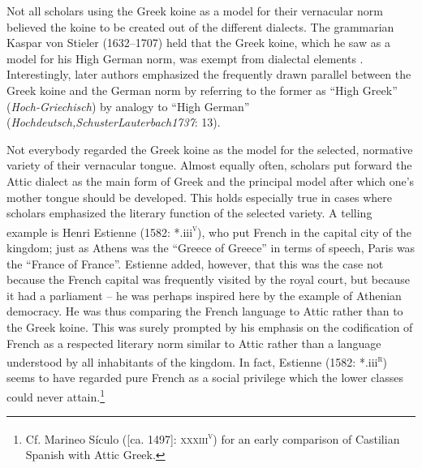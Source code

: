 Not all scholars using the Greek koine as a model for their vernacular norm believed the koine to be created out of the different dialects. The grammarian Kaspar von Stieler (1632–1707) held that the Greek koine, which he saw as a model for his High German norm, was exempt from dialectal elements \citep[2]{Stieler1691}. Interestingly, later authors emphasized the frequently drawn parallel between the Greek koine and the German norm by referring to the former as “High Greek” (\textit{Hoch-Griechisch}) by analogy to “High German” (\textit{Hochdeutsch,SchusterLauterbach1737}: 13).

Not everybody regarded the Greek koine as the model for the selected, normative variety of their vernacular tongue. Almost equally often, scholars put forward the Attic dialect as the main form of Greek and the principal model after which one’s mother tongue should be developed. This holds especially true in cases where scholars emphasized the literary function of the selected variety. A telling example is Henri Estienne (1582: *.iii\textsc{\textsuperscript{v}}), who put French in the capital city of the kingdom; just as Athens was the “Greece of Greece” in terms of speech, Paris was the “France of France”. Estienne added, however, that this was the case not because the French capital was frequently visited by the royal court, but because it had a parliament – he was perhaps inspired here by the example of Athenian democracy. He was thus comparing the French language to Attic rather than to the Greek koine. This was surely prompted by his emphasis on the codification of French as a respected literary norm similar to Attic rather than a language understood by all inhabitants of the kingdom. In fact, Estienne (1582: *.iii\textsc{\textsuperscript{r}}) seems to have regarded pure French as a social privilege which the lower classes could never attain.\footnote{Cf. Marineo Sículo ([ca. 1497]: \textsc{xxxiii}\textsc{\textsuperscript{v}}) for an early comparison of Castilian Spanish with Attic Greek.}

